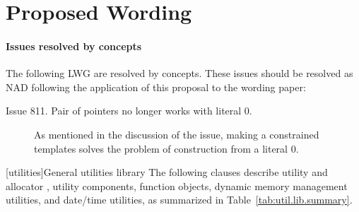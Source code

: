 \documentclass[american,twoside]{book}
\begin{document}
\section*{Proposed Wording}
\paragraph*{Issues resolved by concepts}
The following LWG are resolved by concepts. These issues should be
resolved as NAD following the application of this proposal to the
wording paper:
\begin{description}
\item[Issue 811. Pair of pointers no longer works with literal 0.]  As
  mentioned in the discussion of the issue, making  a
  constrained templates solves the problem of construction from a
  literal 0.
\end{description}

\pagestyle{fancy}
\fancyhead[LE,RO]{\textbf{\rightmark}}
\fancyhead[RE]{\textbf{\leftmark\hspace{1em}\thepage}}
\fancyhead[LO]{\textbf{\thepage\hspace{1em}\leftmark}}


\renewcommand{\sectionmark}[1]{\markright{\thesection\hspace{1em}#1}}
\renewcommand{\chaptermark}[1]{\markboth{#1}{}}

\setcounter{chapter}{19}
[utilities]{General utilities library}
\setcounter{Paras}{1}
\textcolor{black}{\pnum}
The following clauses describe utility and allocator , utility
components,  function objects, dynamic
memory management utilities, and date/time utilities, as summarized in
Table~\ref{tab:util.lib.summary}.
\end{document}
